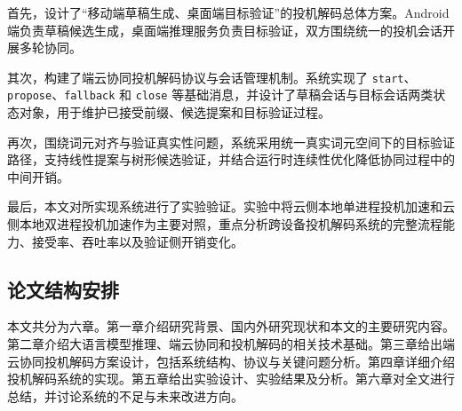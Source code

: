 首先，设计了“移动端草稿生成、桌面端目标验证”的投机解码总体方案。Android 端负责草稿候选生成，桌面端推理服务负责目标验证，双方围绕统一的投机会话开展多轮协同。

其次，构建了端云协同投机解码协议与会话管理机制。系统实现了 \texttt{start}、\texttt{propose}、\texttt{fallback} 和 \texttt{close} 等基础消息，并设计了草稿会话与目标会话两类状态对象，用于维护已接受前缀、候选提案和目标验证过程。

再次，围绕词元对齐与验证真实性问题，系统采用统一真实词元空间下的目标验证路径，支持线性提案与树形候选验证，并结合运行时连续性优化降低协同过程中的中间开销。

最后，本文对所实现系统进行了实验验证。实验中将云侧本地单进程投机加速和云侧本地双进程投机加速作为主要对照，重点分析跨设备投机解码系统的完整流程能力、接受率、吞吐率以及验证侧开销变化。

\subsection{论文结构安排}

本文共分为六章。第一章介绍研究背景、国内外研究现状和本文的主要研究内容。第二章介绍大语言模型推理、端云协同和投机解码的相关技术基础。第三章给出端云协同投机解码方案设计，包括系统结构、协议与关键问题分析。第四章详细介绍投机解码系统的实现。第五章给出实验设计、实验结果及分析。第六章对全文进行总结，并讨论系统的不足与未来改进方向。
